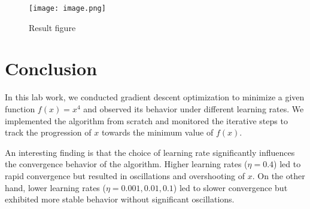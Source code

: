 \documentclass{article}
\begin{document}
\begin{figure}
    \centering
    \texttt{[image: image.png]}
    \caption{Result figure}
    \label{result figure}
\end{figure}


\section{Conclusion}

In this lab work, we conducted gradient descent optimization to minimize a given function $ f(x) = x^4 $ and observed its behavior under different learning rates. We implemented the algorithm from scratch and monitored the iterative steps to track the progression of $ x $ towards the minimum value of $ f(x) $.

An interesting finding is that the choice of learning rate significantly influences the convergence behavior of the algorithm. Higher learning rates ($ \eta = 0.4 $) led to rapid convergence but resulted in oscillations and overshooting of $ x $. On the other hand, lower learning rates ($ \eta = 0.001, 0.01, 0.1 $) led to slower convergence but exhibited more stable behavior without significant oscillations.
\end{document}
